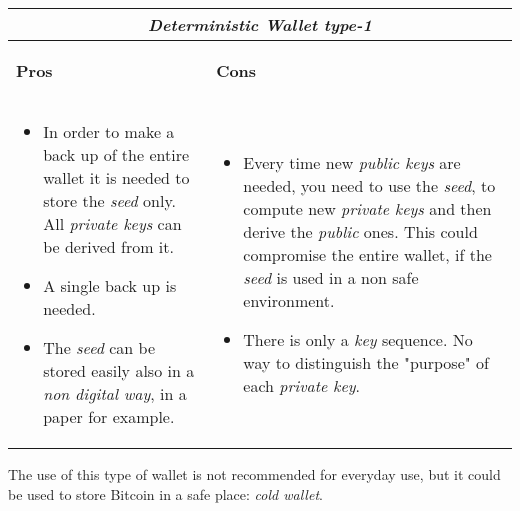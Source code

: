 \begin{center}
	\begin{tabular}{ |p{6cm}|p{6cm}|  }
		\hline
		\multicolumn{2}{|c|}{\textbf{\textit{Deterministic Wallet type-1}}} \\
		\hline \hline 
		\begin{center}
			\textbf{Pros}
		\end{center}&\begin{center}
			\textbf{Cons}
		\end{center}\\
		\hline
		\begin{itemize}
			\item In order to make a back up of the entire wallet it is needed to store the \textit{seed} only. All \textit{private keys} can be derived from it.
			\item A single back up is needed.
			\item The \textit{seed} can be stored easily also in a \textit{non digital way}, in a paper for example.
		\end{itemize} &
		\begin{itemize}
			\item Every time new \textit{public keys} are needed, you need to use the \textit{seed}, to compute new \textit{private keys} and then derive the \textit{public} ones. This could compromise the entire wallet, if the \textit{seed} is used in a non safe environment.
			\item There is only a \textit{key} sequence. No way to distinguish the "purpose" of each \textit{private key}.
		\end{itemize}\\
		\hline
	\end{tabular}
\end{center}
The use of this type of wallet is not recommended for everyday use, but it could be used to store Bitcoin in a safe place: \textit{cold wallet}. 

